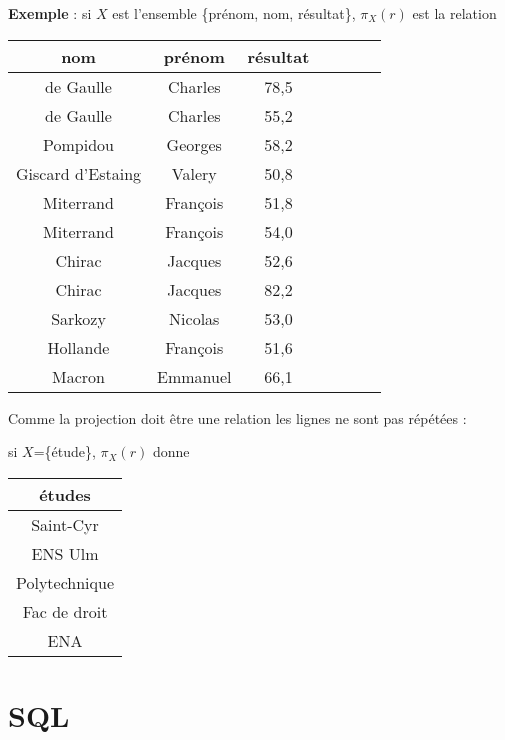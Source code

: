 {\bf Exemple} : si $X$ est l'ensemble \{prénom, nom, résultat\}, 
$\pi_X(r)$ est la relation
\begin{center}
\begin{tabular}{|c|c|c|c|c|c|c|}
\hline
{\bf nom} &{\bf prénom} &{\bf résultat}\\
  \hline
de Gaulle & Charles &78,5\\
de Gaulle & Charles &55,2\\
Pompidou & Georges &58,2\\
Giscard d'Estaing &Valery&50,8\\
Miterrand &François&51,8\\
Miterrand &François&54,0\\
Chirac &Jacques&52,6\\
Chirac &Jacques&82,2\\
Sarkozy &Nicolas&53,0\\
Hollande &François&51,6\\
Macron &Emmanuel&66,1\\
\hline
\end{tabular}
\end{center}
Comme la projection doit être une relation les lignes ne sont pas répétées : 

si $X$=\{étude\}, $\pi_X(r)$ donne
\begin{center}
\begin{tabular}{|c|}
\hline
{\bf études}\\
  \hline
Saint-Cyr\\
  \hline
 ENS Ulm\\
  \hline
Polytechnique\\
  \hline
Fac de droit\\
  \hline
ENA\\
  \hline
\end{tabular}
\end{center}
\newpage
\section{SQL}
